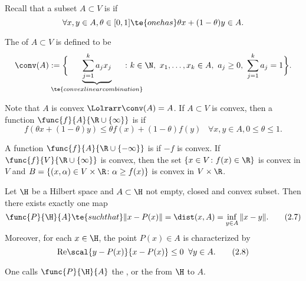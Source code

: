 Recall that a subset $A\subset V$ is  if
\[\forall x,y\in A,\theta\in[0,1]\te{ one has }\theta x+(1-\theta)y\in A.\]
\begin{figure}[!h]\vspace{-5mm}
    \centering
\end{figure}

The  of $A\subset V$ is defined to be
\[\conv(A):=\bigg\{\hspace{-8mm}\underbrace{\sum_{j=1}^ka_jx_j}_{\scriptsize\te{convex linear combination}}\hspace{-8mm}\colon k\in\N,\ x_1,\ldots,x_k\in A,\ a_j\geq0,\ \sum_{j=1}^ka_j=1\bigg\}.\]

Note that $A$ is convex $\Lolrarr\conv(A)=A$. If $A\subset V$ is convex, then a function 
$\func{f}{A}{\R\cup\{\infty\}}$ is  if 
\[f(\theta x+(1-\theta)y)\leq\theta f(x)+(1-\theta)f(y)\;\;\;\forall x,y\in A,0\leq\theta\leq 1.\tag{2.6}\label{2.6}\]

A function $\func{f}{A}{\R\cup\{-\infty\}}$ is  if $-f$ is convex. 
If $\func{f}{V}{\R\cup\{\infty\}}$ is convex, then the set $\{x\in V\colon f(x)\in\R\}$ is convex 
in $V$ and $B=\{(x,\alpha)\in V\times\R\colon \alpha\geq f(x)\}$ is convex in $V\times\R$.

\begin{thm}\label{ii.7}
    Let $\H$ be a Hilbert space and $A\subset\H$ not empty, closed and convex subset. 
    Then there exists exactly one map
    \[\func{P}{\H}{A}\te{ such that }\|x-P(x)\|=\dist(x,A)=\inf_{y\in A}\|x-y\|.\tag{2.7}\label{2.7}\]
    Moreover, for each $x\in\H$, the point $P(x)\in A$ is characterized by
    \[\mathrm{Re}\scal{y-P(x)}{x-P(x)}\leq0\;\;\forall y\in A.\tag{2.8}\label{2.8}\]

    One calls $\func{P}{\H}{A}$ the , or the  from $\H$ to $A$.
\end{thm}

